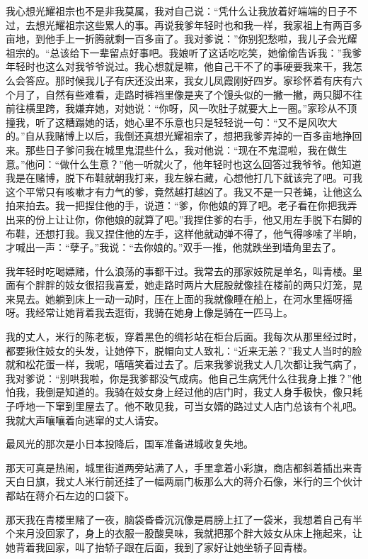 \documentclass[12pt,UTF8]{ctexbook}
\begin{document}
我心想光耀祖宗也不是非我莫属，我对自己说：“凭什么让我放着好端端的日子不过，去想光耀祖宗这些累人的事。再说我爹年轻时也和我一样，我家祖上有两百多亩地，到他手上一折腾就剩一百多亩了。我对爹说：”你别犯愁啦，我儿子会光耀祖宗的。“总该给下一辈留点好事吧。我娘听了这话吃吃笑，她偷偷告诉我：”我爹年轻时也这么对我爷爷说过。我心想就是嘛，他自己干不了的事硬要我来干，我怎么会答应。那时候我儿子有庆还没出来，我女儿凤霞刚好四岁。家珍怀着有庆有六个月了，自然有些难看，走路时裤裆里像是夹了个馒头似的一撇一撇，两只脚不往前往横里跨，我嫌弃她，对她说：“你呀，风一吹肚子就要大上一圈。”家珍从不顶撞我，听了这糟蹋她的话，她心里不乐意也只是轻轻说一句：“又不是风吹大的。”自从我赌博上以后，我倒还真想光耀祖宗了，想把我爹弄掉的一百多亩地挣回来。那些日子爹问我在城里鬼混些什么，我对他说：“现在不鬼混啦，我在做生意。”他问：“做什么生意？”他一听就火了，他年轻时也这么回答过我爷爷。他知道我是在赌博，脱下布鞋就朝我打来，我左躲右藏，心想他打几下就该完了吧。可我这个平常只有咳嗽才有力气的爹，竟然越打越凶了。我又不是一只苍蝇，让他这么拍来拍去。我一把捏住他的手，说道：“爹，你他娘的算了吧。老子看在你把我弄出来的份上让让你，你他娘的就算了吧。”我捏住爹的右手，他又用左手脱下右脚的布鞋，还想打我。我又捏住他的左手，这样他就动弹不得了，他气得哆嗦了半晌，才喊出一声：“孽子。”我说：“去你娘的。”双手一推，他就跌坐到墙角里去了。

我年轻时吃喝嫖赌，什么浪荡的事都干过。我常去的那家妓院是单名，叫青楼。里面有个胖胖的妓女很招我喜爱，她走路时两片大屁股就像挂在楼前的两只灯笼，晃来晃去。她躺到床上一动一动时，压在上面的我就像睡在船上，在河水里摇呀摇呀。我经常让她背着我去逛街，我骑在她身上像是骑在一匹马上。

我的丈人，米行的陈老板，穿着黑色的绸衫站在柜台后面。我每次从那里经过时，都要揪住妓女的头发，让她停下，脱帽向丈人致礼：“近来无恙？”我丈人当时的脸就和松花蛋一样，我呢，嘻嘻笑着过去了。后来我爹说我丈人几次都让我气病了，我对爹说：“别哄我啦，你是我爹都没气成病。他自己生病凭什么往我身上推？”他怕我，我倒是知道的。我骑在妓女身上经过他的店门时，我丈人身手极快，像只耗子呼地一下窜到里屋去了。他不敢见我，可当女婿的路过丈人店门总该有个礼吧。我就大声嚷嚷着向逃窜的丈人请安。

最风光的那次是小日本投降后，国军准备进城收复失地。

那天可真是热闹，城里街道两旁站满了人，手里拿着小彩旗，商店都斜着插出来青天白日旗，我丈人米行前还挂了一幅两扇门板那么大的蒋介石像，米行的三个伙计都站在蒋介石左边的口袋下。

那天我在青楼里赌了一夜，脑袋昏昏沉沉像是肩膀上扛了一袋米，我想着自己有半个来月没回家了，身上的衣服一股酸臭味，我就把那个胖大妓女从床上拖起来，让她背着我回家，叫了抬轿子跟在后面，我到了家好让她坐轿子回青楼。
\end{document}
